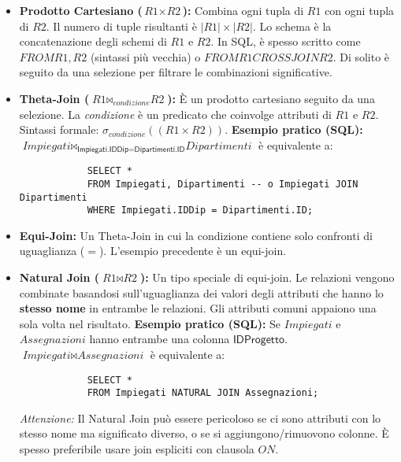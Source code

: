 \documentclass{article}
\newcommand{\Rel}[1]{\textit{#1}} %
\newcommand{\Attr}[1]{\textsf{#1}} %
\newcommand{\myselectop}[2]{\sigma_{#1}(#2)}
\newcommand{\mycartesian}{\times}
\newcommand{\mynaturaljoin}{\bowtie} %
\newcommand{\mythetajoin}[3]{#1 \bowtie_{#2} #3} %
\begin{document}
	\begin{itemize}
		\item \textbf{Prodotto Cartesiano ($\Rel{R1} \mycartesian \Rel{R2}$):}
		Combina ogni tupla di $\Rel{R1}$ con ogni tupla di $\Rel{R2}$. Il numero di tuple risultanti è $|\Rel{R1}| \times |\Rel{R2}|$. Lo schema è la concatenazione degli schemi di $\Rel{R1}$ e $\Rel{R2}$.
		In SQL, è spesso scritto come $FROM R1, R2$ (sintassi più vecchia) o $FROM R1 CROSS JOIN R2$. Di solito è seguito da una selezione per filtrare le combinazioni significative.
		
		\item \textbf{Theta-Join ($\mythetajoin{\Rel{R1}}{condizione}{\Rel{R2}}$):}
		È un prodotto cartesiano seguito da una selezione. La \textit{condizione} è un predicato che coinvolge attributi di $\Rel{R1}$ e $\Rel{R2}$.
		Sintassi formale: $\myselectop{condizione}{(\Rel{R1} \mycartesian \Rel{R2})}$.
		\textbf{Esempio pratico (SQL):}
		$\mythetajoin{\Rel{Impiegati}}{\Attr{Impiegati.IDDip} = \Attr{Dipartimenti.ID}}{\Rel{Dipartimenti}}$
		è equivalente a:
		\begin{verbatim}
			SELECT *
			FROM Impiegati, Dipartimenti -- o Impiegati JOIN Dipartimenti
			WHERE Impiegati.IDDip = Dipartimenti.ID;
		\end{verbatim}
		
		\item \textbf{Equi-Join:} Un Theta-Join in cui la condizione contiene solo confronti di uguaglianza ($=$). L'esempio precedente è un equi-join.
		
		\item \textbf{Natural Join ($\Rel{R1} \mynaturaljoin \Rel{R2}$):}
		Un tipo speciale di equi-join. Le relazioni vengono combinate basandosi sull'uguaglianza dei valori degli attributi che hanno lo \textbf{stesso nome} in entrambe le relazioni. Gli attributi comuni appaiono una sola volta nel risultato.
		\textbf{Esempio pratico (SQL):} Se $\Rel{Impiegati}$ e $\Rel{Assegnazioni}$ hanno entrambe una colonna $\Attr{IDProgetto}$.
		$\Rel{Impiegati} \mynaturaljoin \Rel{Assegnazioni}$
		è equivalente a:
		\begin{verbatim}
			SELECT *
			FROM Impiegati NATURAL JOIN Assegnazioni;
		\end{verbatim}
		\textit{Attenzione:} Il Natural Join può essere pericoloso se ci sono attributi con lo stesso nome ma significato diverso, o se si aggiungono/rimuovono colonne. È spesso preferibile usare join espliciti con clausola $ON$.
	\end{itemize}
	
\end{document}
